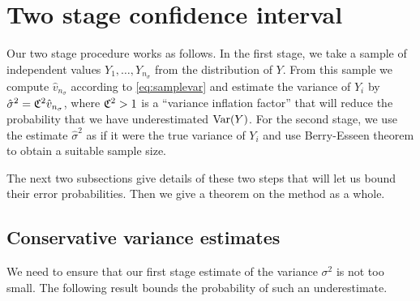 \documentclass{article}
\begin{document}
\section{Two stage confidence interval}\label{sec:twostage}

Our two stage procedure works as follows.
In the first stage, we take a sample of 
independent values $Y_1,\dots,Y_{n_\sigma}$
from the distribution of $Y$.
From this sample we compute
$\hat v_{n_\sigma}$ according to 
\eqref{eq:samplevar} and estimate
the variance of $Y_i$ by
$\hat\sigma^2 = \mathfrak{C}^2\hat v_{n_\sigma}$, where
$\mathfrak{C}^2>1$ is a ``variance inflation factor''
that will reduce the probability that we have
underestimated $\mathrm{Var}(Y)$.
For the second stage, we use the estimate
$\hat \sigma^2$ as if it were the true
variance of $Y_i$ and use
Berry-Esseen theorem to obtain a suitable
sample size.

The next two subsections give details of
these two steps that will let us bound
their error probabilities. Then we give
a theorem on the method as a whole.


\subsection{Conservative variance estimates}

We need to ensure that our first stage estimate of the
variance $\sigma^2$ is not too small. The following
result bounds the probability of such an underestimate.
\end{document}
